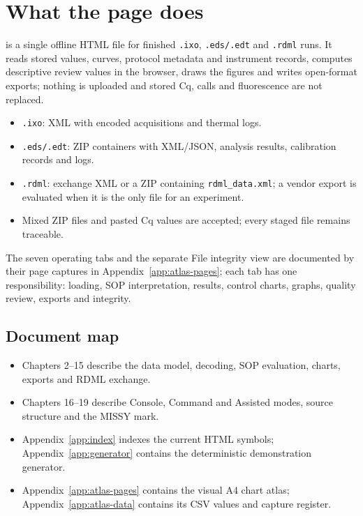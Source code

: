 \chapter{What the page does}\label{ch:intro}

\page is a single offline HTML file for finished \texttt{.ixo}, \texttt{.eds/.edt} and \texttt{.rdml} runs. It reads stored values, curves, protocol metadata and instrument records, computes descriptive review values in the browser, draws the figures and writes open-format exports; nothing is uploaded and stored Cq, calls and fluorescence are not replaced.

\begin{itemize}
\item \texttt{.ixo}: XML with encoded acquisitions and thermal logs.
\item \texttt{.eds/.edt}: ZIP containers with XML/JSON, analysis results, calibration records and logs.
\item \texttt{.rdml}: exchange XML or a ZIP containing \texttt{rdml\_data.xml}; a vendor export is evaluated when it is the only file for an experiment.
\item Mixed ZIP files and pasted Cq values are accepted; every staged file remains traceable.
\end{itemize}

The seven operating tabs and the separate File integrity view are documented by their page captures in Appendix~\ref{app:atlas-pages}; each tab has one responsibility: loading, SOP interpretation, results, control charts, graphs, quality review, exports and integrity.

\section*{Document map}
\begin{itemize}
\item Chapters 2--15 describe the data model, decoding, SOP evaluation, charts, exports and RDML exchange.
\item Chapters 16--19 describe Console, Command and Assisted modes, source structure and the MISSY mark.
\item Appendix~\ref{app:index} indexes the current HTML symbols; Appendix~\ref{app:generator} contains the deterministic demonstration generator.
\item Appendix~\ref{app:atlas-pages} contains the visual A4 chart atlas; Appendix~\ref{app:atlas-data} contains its CSV values and capture register.
\end{itemize}

